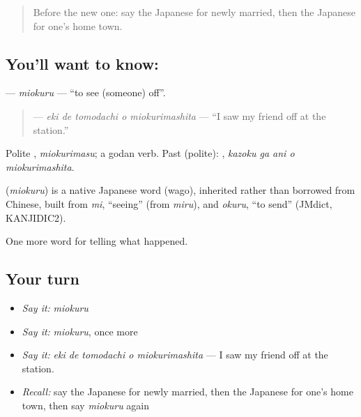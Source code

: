 \begin{quote}
Before the new one: say the Japanese for newly married, then the Japanese for one's home town.
\end{quote}

\subsection*{You'll want to know: }
\textbf{} — \emph{miokuru} — \textquotedblleft{}to see (someone) off\textquotedblright{}.

\begin{quote}
\textbf{  } — \emph{eki de tomodachi o miokurimashita} — \textquotedblleft{}I saw my friend off at the station.\textquotedblright{}
\end{quote}

Polite \textbf{}, \emph{miokurimasu}; a godan verb. Past (polite): \textbf{  }, \emph{kazoku ga ani o miokurimashita}.

\begin{cousinweb}
\textbf{} (\emph{miokuru}) is a native Japanese word (wago), inherited rather than borrowed from Chinese, built from \emph{mi}, \textquotedblleft{}seeing\textquotedblright{} (from \emph{miru}), and \emph{okuru}, \textquotedblleft{}to send\textquotedblright{} (JMdict, KANJIDIC2).
\end{cousinweb}

\begin{grammarlens}[title={What you've built}]
One more word for telling what happened.
\end{grammarlens}

\subsection*{Your turn}
\begin{itemize}
\raggedright
  \item \emph{Say it:} \emph{miokuru}
  \item \emph{Say it:} \emph{miokuru}, once more
  \item \emph{Say it:} \emph{eki de tomodachi o miokurimashita} — I saw my friend off at the station.
  \item \emph{Recall:} say the Japanese for newly married, then the Japanese for one's home town, then say \emph{miokuru} again
\end{itemize}

